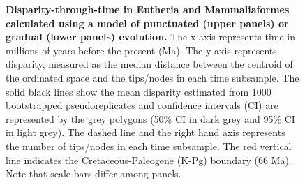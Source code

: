 \documentclass[10pt,letterpaper]{article}
\begin{document}
\begin{figure}[h]
\caption{{\bf Disparity-through-time in Eutheria and Mammaliaformes calculated using a model of punctuated (upper panels) or gradual (lower panels) evolution.}
The x axis represents time in millions of years before the present (Ma). The y axis represents disparity, measured as the median distance between the centroid of the ordinated space and the tips/nodes in each time subsample. The solid black lines show the mean disparity estimated from 1000 bootstrapped pseudoreplicates and confidence intervals (CI) are represented by the grey polygons (50\% CI in dark grey and 95\% CI in light grey). The dashed line and the right hand axis represents the number of tips/nodes in each time subsample. The red vertical line indicates the Cretaceous-Paleogene (K-Pg) boundary (66 Ma). Note that scale bars differ among panels.}
\label{fig:Fig_Raw_results}
\end{figure}
\end{document}

